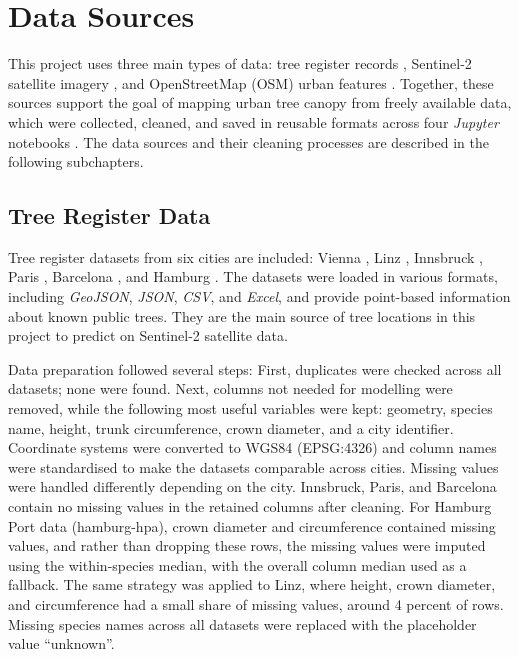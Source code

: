 \section{Data Sources}

This project uses three main types of data: tree register records \cite{linzcadastre, baumkataster2025, innsbruckcadastre, parisarbres, barcelonaarbrat, hamburgbaumkataster}, Sentinel-2 satellite imagery \cite{earthenginecodeeditor}, and OpenStreetMap (OSM) urban features \cite{geofabrikeurope}. Together, these sources support the goal of mapping urban tree canopy from freely available data, which were collected, cleaned, and saved in reusable formats across four \textit{Jupyter} notebooks \cite{scraperbaumkataster, scrapersentinelosmnotebook, scrapermoredata, scraperdatabase}. The data sources and their cleaning processes are described in the following subchapters.

\subsection{Tree Register Data}

Tree register datasets from six cities are included: Vienna \cite{baumkataster2025}, Linz \cite{linzcadastre}, Innsbruck \cite{innsbruckcadastre}, Paris \cite{parisarbres}, Barcelona \cite{barcelonaarbrat}, and Hamburg \cite{hamburgbaumkataster}. The datasets were loaded in various formats, including \textit{GeoJSON}, \textit{JSON}, \textit{CSV}, and \textit{Excel}, and provide point-based information about known public trees. They are the main source of tree locations in this project to predict on Sentinel-2 satellite data.

Data preparation followed several steps: First, duplicates were checked across all datasets; none were found. Next, columns not needed for modelling were removed, while the following most useful variables were kept: geometry, species name, height, trunk circumference, crown diameter, and a city identifier. Coordinate systems were converted to WGS84 (EPSG:4326) and column names were standardised to make the datasets comparable across cities. Missing values were handled differently depending on the city. Innsbruck, Paris, and Barcelona contain no missing values in the retained columns after cleaning. For Hamburg Port data (hamburg-hpa), crown diameter and circumference contained missing values, and rather than dropping these rows, the missing values were imputed using the within-species median, with the overall column median used as a fallback. The same strategy was applied to Linz, where height, crown diameter, and circumference had a small share of missing values, around 4 percent of rows. Missing species names across all datasets were replaced with the placeholder value ``unknown''.

